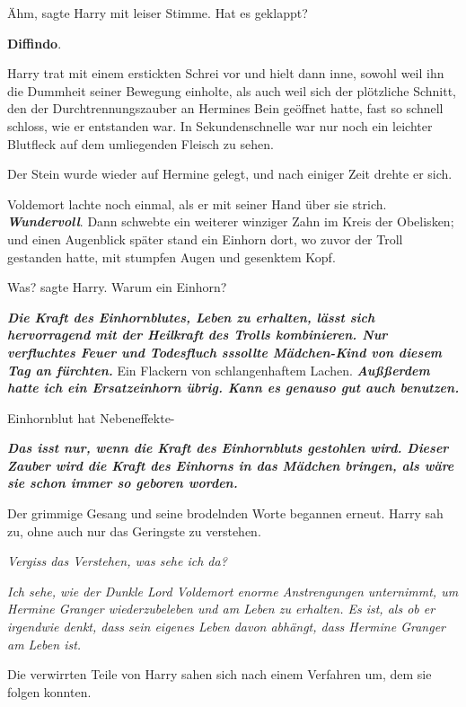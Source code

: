 \glqq{}Ähm\grqq{}, sagte Harry mit leiser Stimme. \glqq{}Hat es geklappt?\grqq{}

\glqq{}\textbf{Diffindo}.\grqq{}

Harry trat mit einem erstickten Schrei vor und hielt dann inne, sowohl weil ihn
die Dummheit seiner Bewegung einholte, als auch weil sich der plötzliche
Schnitt, den der Durchtrennungszauber an Hermines Bein geöffnet hatte, fast so
schnell schloss, wie er entstanden war. In Sekundenschnelle war nur noch ein
leichter Blutfleck auf dem umliegenden Fleisch zu sehen.

Der Stein wurde wieder auf Hermine gelegt, und nach einiger Zeit drehte er sich.

Voldemort lachte noch einmal, als er mit seiner Hand über sie strich. \glqq{}
\textbf{\emph{Wundervoll}}.\grqq{} Dann schwebte ein weiterer winziger Zahn im Kreis
der Obelisken; und einen Augenblick später stand ein Einhorn dort, wo zuvor der
Troll gestanden hatte, mit stumpfen Augen und gesenktem Kopf.

\glqq{}Was?\grqq{} sagte Harry. \glqq{}Warum ein Einhorn?\grqq{}

\glqq{}\textbf{\emph{Die Kraft des Einhornblutes, Leben zu erhalten, lässt sich
hervorragend mit der Heilkraft des Trolls kombinieren. Nur verfluchtes Feuer und
Todesfluch sssollte Mädchen-Kind von diesem Tag an fürchten.}}\grqq{} Ein Flackern von
schlangenhaftem Lachen. \glqq{}\textbf{\emph{Außßerdem hatte ich ein
Ersatzeinhorn übrig. Kann es genauso gut auch benutzen.}}\grqq{}

\glqq{}Einhornblut hat Nebeneffekte-\grqq{}

\glqq{}\textbf{\emph{Das isst nur, wenn die Kraft des Einhornbluts gestohlen
wird. Dieser Zauber wird die Kraft des Einhorns in das Mädchen bringen, als wäre
sie schon immer so geboren worden.}}\grqq{}

Der grimmige Gesang und seine brodelnden Worte begannen erneut. Harry sah zu,
ohne auch nur das Geringste zu verstehen.

\emph{Vergiss das Verstehen, was sehe ich da?}

\emph{Ich sehe, wie der Dunkle Lord Voldemort enorme Anstrengungen unternimmt,
um Hermine Granger wiederzubeleben und am Leben zu erhalten. Es ist, als ob er
irgendwie denkt, dass sein eigenes Leben davon abhängt, dass Hermine Granger am
Leben ist.}

Die verwirrten Teile von Harry sahen sich nach einem Verfahren um, dem sie
folgen konnten.

